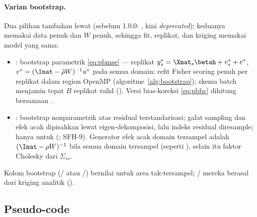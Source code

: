\paragraph{Varian bootstrap.} Dua pilihan tambahan lewat
 (sebelum 1.0.0: , kini \emph{deprecated}); keduanya memakai data penuh dan $W$ penuh, sehingga fit,
replikat, dan kriging memakai model yang sama:
\begin{itemize}
  \item {}: bootstrap parametrik \eqref{eq:pbmse} --- replikat
        $y^\ast_s=\Xmat_s\betah+v^\ast_s+e^\ast$,
        $v^\ast=(\Imat-\hat\rho W)^{-1}u^\ast$ pada semua domain; refit
        Fisher scoring penuh per replikat dalam region OpenMP
        (algoritme~\ref{alg:bootstrap}); skema batch menjamin tepat $B$
        replikat valid (). Versi
        bias-koreksi \eqref{eq:pbbc} dihitung bersamaan
        \citep{molina2009bootstrap}.
  \item {}: bootstrap nonparametrik atas residual
        terstandarisasi; galat sampling dan efek acak dipisahkan lewat
        eigen-dekomposisi, lalu indeks residual diresample; hanya untuk
         (;
        SFH-9). Generator efek acak domain tersampel adalah
        $(\Imat-\rho W)^{-1}$ bila semua domain tersampel (seperti
        ), selain itu faktor Cholesky dari
        $\Sigma_{ss}$.
\end{itemize}
Kolom bootstrap (/ atau
/) bernilai  untuk area
tak-tersampel; / mereka berasal dari kriging analitik
().

\subsection{Pseudo-code}\label{sec:sfh-algo}

